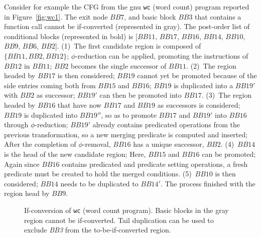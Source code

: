 Consider for example the CFG from the gnu \texttt{wc} (word count) program reported in Figure~\ref{fig:wc1}. 
The exit node $\textit{BB}7$, and basic block $\textit{BB}3$ that contains a function call cannot be if-converted (represented in gray). 
The post-order list of conditional blocks (represented in bold) is [$\textit{BB}11$, $\textit{BB}17$, $\textit{BB}16$, $\textit{BB}14$, $\textit{BB}10$, $\textit{BB}9$, $\textit{BB}6$, $\textit{BB}2$]. 
(1)~The first candidate region is composed of $\{\textit{BB11}, \textit{BB}2, \textit{BB}12\}$; 
$\phi$-reduction can be applied, promoting the instructions of $\textit{BB}12$ in $\textit{BB}11$; 
$\textit{BB}2$ becomes the single successor of $\textit{BB}11$. 
(2)~The region headed by $\textit{BB}17$ is then considered; 
$\textit{BB}19$ cannot yet be promoted because of the side entries coming both from $\textit{BB}15$ and $\textit{BB}16$; 
$\textit{BB}19$ is duplicated into a $\textit{BB}19'$ with $\textit{BB}2$ as successor; 
$\textit{BB}19'$ can then be promoted into $\textit{BB}17$. 
(3)~The region headed by $\textit{BB}16$ that have now $\textit{BB}17$ and $\textit{BB}19$ as successors is considered; 
$\textit{BB}19$ is duplicated into $\textit{BB}19''$, so as to promote $\textit{BB}17$ and $\textit{BB}19'$ into $\textit{BB}16$ through $\phi$-reduction; 
$\textit{BB}19'$ already contains predicated operations from the previous transformation, so a new merging predicate is computed and inserted; 
After the completion of $\phi$-removal, $\textit{BB}16$ has a unique successor, $\textit{BB}2$. 
(4)~$\textit{BB}14$ is the head of the new candidate region;
Here, $\textit{BB}15$ and $\textit{BB}16$ can be promoted; 
Again since $\textit{BB}16$ contains predicated and predicate setting operations, a fresh predicate must be created to hold the merged conditions. 
(5)~$\textit{BB}10$ is then considered; 
$\textit{BB}14$ needs to be duplicated to $\textit{BB}14'$. 
The process finished with the region head by $\textit{BB}9$.

\begin{figure}
\caption{\label{fig:wc example}If-conversion of \texttt{wc} (word count program). Basic blocks in the gray region cannot be if-converted. Tail duplication can be used to exclude \textit{BB3} from the to-be-if-converted region.}
\end{figure}


